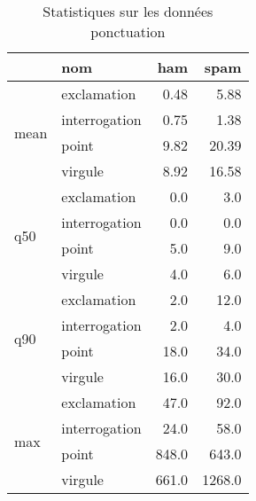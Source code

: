 \begin{table}[H]
\centering
\caption{Statistiques sur les données ponctuation}
\label{tab:f_ponctuation}
\begin{tabular}{ll|rr}
\toprule
 & nom & ham & spam \\
\midrule
\multirow[c]{4}{*}{mean} & exclamation & 0.48 & 5.88 \\
 & interrogation & 0.75 & 1.38 \\
 & point & 9.82 & 20.39 \\
 & virgule & 8.92 & 16.58 \\
\cline{1-4}
\multirow[c]{4}{*}{q50} & exclamation & 0.0 & 3.0 \\
 & interrogation & 0.0 & 0.0 \\
 & point & 5.0 & 9.0 \\
 & virgule & 4.0 & 6.0 \\
\cline{1-4}
\multirow[c]{4}{*}{q90} & exclamation & 2.0 & 12.0 \\
 & interrogation & 2.0 & 4.0 \\
 & point & 18.0 & 34.0 \\
 & virgule & 16.0 & 30.0 \\
\cline{1-4}
\multirow[c]{4}{*}{max} & exclamation & 47.0 & 92.0 \\
 & interrogation & 24.0 & 58.0 \\
 & point & 848.0 & 643.0 \\
 & virgule & 661.0 & 1268.0 \\
\cline{1-4}
\bottomrule
\end{tabular}
\end{table}
